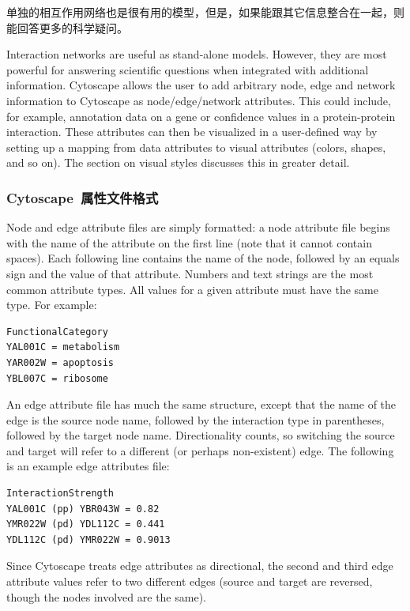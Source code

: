 单独的相互作用网络也是很有用的模型，但是，如果能跟其它信息整合在一起，则能回答更多的科学疑问。


Interaction networks are useful as stand-alone models. However, they are most
powerful for answering scientific questions when integrated with additional
information. Cytoscape allows the user to add arbitrary node, edge and network
information to Cytoscape as node/edge/network attributes. This could include,
for example, annotation data on a gene or confidence values in a
protein-protein interaction. These attributes can then be visualized in a
user-defined way by setting up a mapping from data attributes to visual
attributes (colors, shapes, and so on). The section on  visual styles discusses
this in greater detail. 

\subsubsection{Cytoscape~属性文件格式}

 Node and edge attribute files are simply formatted: a node attribute file
begins with the name of the attribute on the first line (note that it cannot
contain spaces). Each following line contains the name of the node, followed by
an equals sign and the value of that attribute. Numbers and text strings are
the most common attribute types. All values for a given attribute must have the
same type. For example: 

 \begin{verbatim}
FunctionalCategory
YAL001C = metabolism
YAR002W = apoptosis
YBL007C = ribosome
\end{verbatim}

 An edge attribute file has much the same structure, except that the name of
the edge is the source node name, followed by the interaction type in
parentheses, followed by the target node name. Directionality counts, so
switching the source and target will refer to a different (or perhaps
non-existent) edge. The following is an example edge attributes file: 

 \begin{verbatim}
InteractionStrength
YAL001C (pp) YBR043W = 0.82
YMR022W (pd) YDL112C = 0.441
YDL112C (pd) YMR022W = 0.9013
\end{verbatim}

 Since Cytoscape treats edge attributes as directional, the second and third
edge attribute values refer to two different edges (source and target are
reversed, though the nodes involved are the same). 


